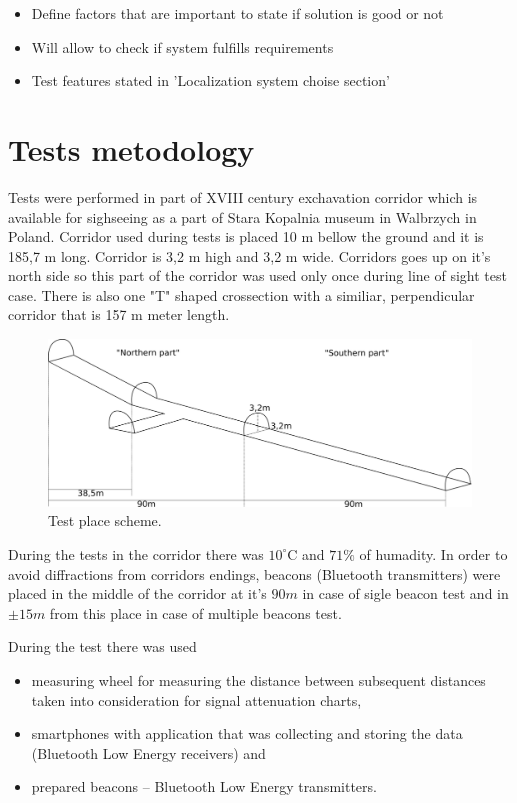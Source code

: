 \documentclass[../main.tex]{subfiles}
\begin{document}
\begin{itemize}
	\item Define factors that are important to state if solution is good or not
	\item Will allow to check if system fulfills requirements
	\item Test features stated in 'Localization system choise section'
\end{itemize}


\section{Tests metodology} %
\label{sec:tests_metodology}

Tests were performed in part of XVIII century exchavation corridor which is available for sighseeing as a part of Stara Kopalnia museum in Walbrzych in Poland. Corridor used during tests is placed 10 m bellow the ground and it is 185,7 m long. Corridor is 3,2 m high and 3,2 m wide. Corridors goes up on it's north side so this part of the corridor was used only once during line of sight test case. There is also one "T" shaped crossection with a similiar, perpendicular corridor that is 157 m meter length.

\begin{figure}[!htbp]
\includegraphics[width=\textwidth, keepaspectratio]{pictures/corridor.pdf}
\centering
\caption{Test place scheme.}
\label{fig:corridor}
\end{figure}

During the tests in the corridor there was $10^\circ$C  and $71 \%$ of humadity. In order to avoid diffractions from corridors endings, beacons (Bluetooth transmitters) were placed in the middle of the corridor at it's $90 m$ in case of sigle beacon test and in $\pm15 m$ from this place in case of multiple beacons test.

During the test there was used
\begin{itemize}
	\item  measuring wheel for measuring the distance between subsequent distances taken into consideration for signal attenuation charts,
	\item smartphones with application that was collecting and storing the data (Bluetooth Low Energy receivers) and
	\item prepared beacons -- Bluetooth Low Energy transmitters.
\end{itemize}
\end{document}
